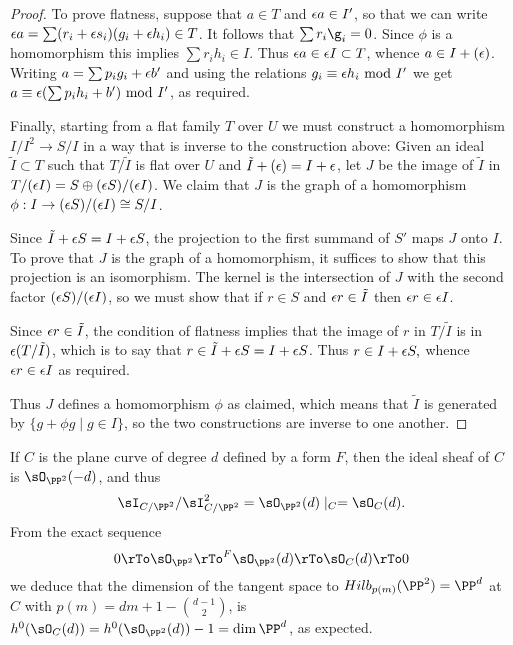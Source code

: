 \begin{proof}
To prove flatness, suppose that $a\in T$ and  $\eps a  \in I'$,
so that we can write  $\eps a= \sum(r_i+\eps s_i)(g_i+\eps h_i) \in T$.
It follows that 
$\sum r_i\g_i = 0$. Since $\phi$ is a homomorphism this implies $\sum r_i h_i \in I.$ Thus
$\eps a \in  \eps I\subset T$, whence $a\in I + (\eps)$.  Writing $a =\sum p_i g_i+\eps b'$
and using the relations $g_i \equiv \eps h_i \hbox{ mod } I'$ we get
 $a \equiv \eps (\sum p_i h_i+b') \hbox{ mod } I'$, as required.

Finally, starting from a flat family $T$ over $U$ we must construct a homomorphism $I/I^2 \to S/I$  in a way that is inverse to the construction above: Given an ideal $\tilde I \subset T$ such that $T/\tilde I$ is flat over $U$ and $\tilde I + (\eps) = I +\eps$, 
let $J$ be the image of $\tilde I$ in $T/(\eps I) = S \oplus (\eps S)/(\eps I)$. We claim that $J$ is the graph of a homomorphism $\phi: I \to  (\eps S)/(\eps I) \cong S/I$. 

Since $\tilde I + \eps S = I +\eps S$,  the projection  to the first  summand of $S'$ maps $J$ onto $I$. 
To prove that $J$ is the graph of a homomorphism, it suffices to show that this projection is an isomorphism.
The kernel is
the intersection of $J$ with the second factor $(\eps S)/(\eps I )$, so we must show that
if $r\in S$ and $\eps r \in \tilde I$ then $\eps r \in \eps I$. 

Since $\eps r \in \tilde I$, the condition of flatness implies
that the image of $r$ in $T/\tilde I$ is in $\eps(T/\tilde I)$, which is to say that $r \in \tilde I + \eps S = I +\eps S$.
Thus $r \in  I + \eps S,$ whence $\eps  r \in \eps I$ as required.

Thus
$J$ defines a homomorphism $\phi$ as claimed, which means that
 $\tilde I$ is generated by $\{g+\phi g\mid g\in I\}$, so the two constructions are inverse to one another.
\end{proof}

\begin{example}\label{Hilb for plane curves-continued}
If $C$ is the plane curve of degree $d$ defined by a form $F$, then the ideal sheaf of $C$ is $\sO_{\PP^2}(-d)$, and thus
$$
\sI_{C/\PP^2}/\sI_{C/\PP^2}^2 = \sO_{\PP^2}(d)\mid_C = \sO_C(d).
$$
From the exact sequence 
$$
0\rTo\sO_{\PP^2}\rTo^F\sO_{\PP^2}(d) \rTo\sO_C(d)\rTo 0
$$
we deduce that the dimension of the tangent space to $Hilb_{p(m)}(\PP^2)=\PP^d$  at $C$
with $p(m) = dm+1-{d-1\choose 2}$,
is $h^0(\sO_C(d)) = h^0(\sO_{\PP^2}(d))-1 = \dim \PP^d$, as expected.
\end{example}

